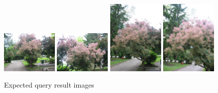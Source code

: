 \documentclass[12pt]{article}
\begin{document}
\begin{itemize}
\begin{figure}[H]
	\centering
	\includegraphics[width=0.24\textwidth]{hvUYrvNcps.jpg}
	\includegraphics[width=0.24\textwidth]{qRsMWVmGMO.jpg}
	\includegraphics[width=0.24\textwidth]{fwemBvAkmG.jpg}
	\includegraphics[width=0.24\textwidth]{ghhWOLnrEn.jpg}
	\caption{Expected query result images}
\end{figure}


\end{itemize}
\end{document}
